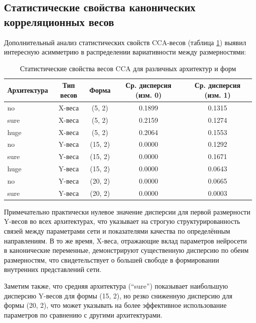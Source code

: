 \documentclass[a4paper,12pt]{article}
\begin{document}
\subsection{Статистические свойства канонических корреляционных весов}

Дополнительный анализ статистических свойств CCA-весов (таблица \ref{tab:cca_stats}) выявил интересную
асимметрию в распределении вариативности между размерностями:

\begin{table}[ht]
  \centering
  \caption{Статистические свойства весов CCA для различных архитектур и форм}
  \label{tab:cca_stats}
  \begin{tabular}{|l|c|c|c|c|}
    \hline
    \textbf{Архитектура} & \textbf{Тип весов} & \textbf{Форма} & \textbf{Ср. дисперсия (изм. 0)} &
    \textbf{Ср. дисперсия (изм. 1)} \\
    \hline
    no & X-веса & (5, 2) & 0.1899 & 0.1315 \\
    sure & X-веса & (5, 2) & 0.2159 & 0.1274 \\
    huge & X-веса & (5, 2) & 0.2064 & 0.1553 \\
    \hline
    no & Y-веса & (15, 2) & 0.0000 & 0.1292 \\
    sure & Y-веса & (15, 2) & 0.0000 & 0.1671 \\
    huge & Y-веса & (15, 2) & 0.0000 & 0.0643 \\
    \hline
    no & Y-веса & (20, 2) & 0.0000 & 0.0665 \\
    sure & Y-веса & (20, 2) & 0.0000 & 0.0003 \\
    \hline
  \end{tabular}
\end{table}

Примечательно практически нулевое значение дисперсии для первой размерности Y-весов во всех архитектурах, что
указывает на строгую структурированность связей между параметрами сети и показателями качества по
определённым направлениям. В то же время, X-веса, отражающие вклад параметров нейросети в канонические
переменные, демонстрируют существенную дисперсию по обеим размерностям, что свидетельствует о большей свободе
в формировании внутренних представлений сети.

Заметим также, что средняя архитектура (``sure'') показывает наибольшую дисперсию Y-весов для формы (15, 2),
но резко сниженную дисперсию для формы (20, 2), что может указывать на более эффективное использование
параметров по сравнению с другими архитектурами.
\end{document}
